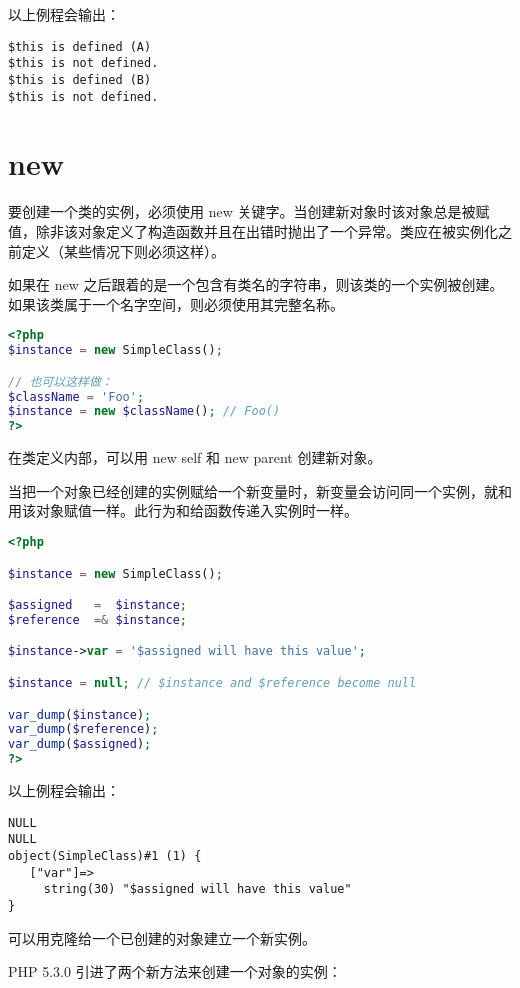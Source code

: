 以上例程会输出：

\begin{verbatim}
$this is defined (A)
$this is not defined.
$this is defined (B)
$this is not defined.
\end{verbatim}


\section{new}

要创建一个类的实例，必须使用 new 关键字。当创建新对象时该对象总是被赋值，除非该对象定义了构造函数并且在出错时抛出了一个异常。类应在被实例化之前定义（某些情况下则必须这样）。

如果在 new 之后跟着的是一个包含有类名的字符串，则该类的一个实例被创建。如果该类属于一个名字空间，则必须使用其完整名称。



\begin{lstlisting}[language=PHP]
<?php
$instance = new SimpleClass();

// 也可以这样做：
$className = 'Foo';
$instance = new $className(); // Foo()
?>
\end{lstlisting}

在类定义内部，可以用 new self 和 new parent 创建新对象。

当把一个对象已经创建的实例赋给一个新变量时，新变量会访问同一个实例，就和用该对象赋值一样。此行为和给函数传递入实例时一样。


\begin{lstlisting}[language=PHP]
<?php

$instance = new SimpleClass();

$assigned   =  $instance;
$reference  =& $instance;

$instance->var = '$assigned will have this value';

$instance = null; // $instance and $reference become null

var_dump($instance);
var_dump($reference);
var_dump($assigned);
?>
\end{lstlisting}

以上例程会输出：

\begin{verbatim}
NULL
NULL
object(SimpleClass)#1 (1) {
   ["var"]=>
     string(30) "$assigned will have this value"
}
\end{verbatim}

可以用克隆给一个已创建的对象建立一个新实例。

PHP 5.3.0 引进了两个新方法来创建一个对象的实例：






